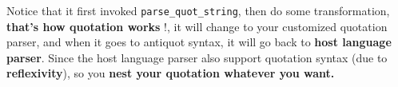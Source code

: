 \documentclass[svgnames,12pt,a4paper]{report}
\begin{document}
Notice that it first invoked \verb|parse_quot_string|, then do some
transformation, \textbf{ that's how quotation works} !, it will change
to your customized quotation parser, and when it goes to antiquot
syntax, it will go back to \textbf{ host language parser}. Since the
host language parser also support quotation syntax (due to \textbf{
reflexivity}), so you \textbf{ nest your quotation whatever you
  want.}









\end{document}
